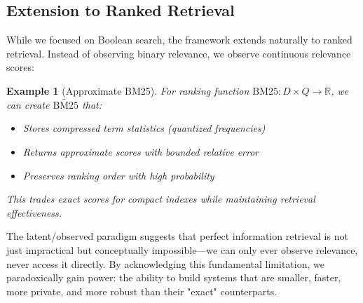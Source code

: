 \documentclass[11pt,final,hidelinks]{article}
\newtheorem{example}[theorem]{Example}
\newcommand{\obs}[1]{\widetilde{#1}}  %
\begin{document}
\subsection{Extension to Ranked Retrieval}

While we focused on Boolean search, the framework extends naturally to ranked retrieval. Instead of observing binary relevance, we observe continuous relevance scores:

\begin{example}[Approximate BM25]
For ranking function $\text{BM25}: D \times Q \to \mathbb{R}$, we can create $\obs{\text{BM25}}$ that:
\begin{itemize}
    \item Stores compressed term statistics (quantized frequencies)
    \item Returns approximate scores with bounded relative error
    \item Preserves ranking order with high probability
\end{itemize}
This trades exact scores for compact indexes while maintaining retrieval effectiveness.
\end{example}

The latent/observed paradigm suggests that perfect information retrieval is not just impractical but conceptually impossible—we can only ever observe relevance, never access it directly. By acknowledging this fundamental limitation, we paradoxically gain power: the ability to build systems that are smaller, faster, more private, and more robust than their "exact" counterparts.




\end{document}
